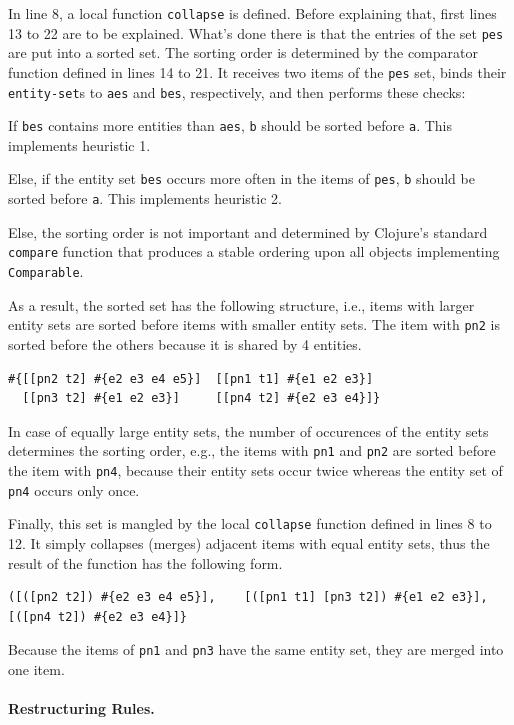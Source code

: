 \documentclass[submission]{eptcs}
\begin{document}
In line 8, a local function \verb|collapse| is defined.  Before explaining
that, first lines 13 to 22 are to be explained.  What's done there is that the
entries of the set \verb|pes| are put into a sorted set.  The sorting order is
determined by the comparator function defined in lines 14 to 21.  It receives
two items of the \verb|pes| set, binds their \verb|entity-set|s to \verb|aes|
and \verb|bes|, respectively, and then performs these checks:
\begin{compactenum}
\item If \verb|bes| contains more entities than \verb|aes|, \verb|b| should be
  sorted before \verb|a|.  This implements heuristic 1.
\item Else, if the entity set \verb|bes| occurs more often in the items of
  \verb|pes|, \verb|b| should be sorted before \verb|a|.  This implements
  heuristic 2.
\item Else, the sorting order is not important and determined by Clojure's
  standard \verb|compare| function that produces a stable ordering upon all
  objects implementing \verb|Comparable|.
\end{compactenum}
As a result, the sorted set has the following structure, i.e., items with
larger entity sets are sorted before items with smaller entity sets.  The item
with \verb|pn2| is sorted before the others because it is shared by 4 entities.
\begin{Verbatim}[fontsize=\footnotesize]
#{[[pn2 t2] #{e2 e3 e4 e5}]  [[pn1 t1] #{e1 e2 e3}]
  [[pn3 t2] #{e1 e2 e3}]     [[pn4 t2] #{e2 e3 e4}]}
\end{Verbatim}
In case of equally large entity sets, the number of occurences of
the entity sets determines the sorting order, e.g., the items with \verb|pn1|
and \verb|pn2| are sorted before the item with \verb|pn4|, because their entity
sets occur twice whereas the entity set of \verb|pn4| occurs only once.

Finally, this set is mangled by the local \verb|collapse| function defined in
lines 8 to 12.  It simply collapses (merges) adjacent items with equal entity
sets, thus the result of the function has the following form.
\begin{Verbatim}[fontsize=\footnotesize]
([([pn2 t2]) #{e2 e3 e4 e5}],    [([pn1 t1] [pn3 t2]) #{e1 e2 e3}],    [([pn4 t2]) #{e2 e3 e4}]}
\end{Verbatim}
Because the items of \verb|pn1| and \verb|pn3| have the same entity set, they
are merged into one item.


\paragraph{Restructuring Rules.}
\end{document}
